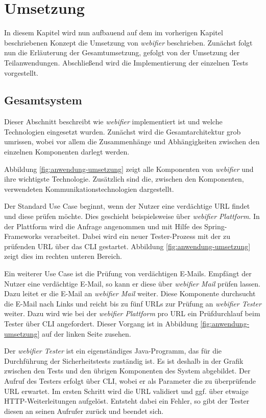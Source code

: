 \chapter{Umsetzung}

In diesem Kapitel wird nun aufbauend auf dem im vorherigen Kapitel beschriebenen Konzept die
Umsetzung von \textit{webifier} beschrieben. Zunächst folgt nun die Erläuterung der Gesamtumsetzung,
gefolgt von der Umsetzung der Teilanwendungen. Abschließend wird die Implementierung der einzelnen Tests vorgestellt.

\section{Gesamtsystem}

Dieser Abschnitt beschreibt wie \textit{webifier} implementiert ist und welche Technologien
eingesetzt wurden.
Zunächst wird die Gesamtarchitektur grob umrissen, wobei vor allem die Zusammenhänge
und Abhängigkeiten zwischen den einzelnen Komponenten darlegt werden.

Abbildung \ref{fig:anwendung-umsetzung} zeigt alle Komponenten von \textit{webifier} und ihre
wichtigste Technologie.
Zusätzlich sind die, zwischen den Komponenten, verwendeten
Kommunikationstechnologien dargestellt.

Der Standard Use Case beginnt, wenn der Nutzer eine verdächtige \acs{URL} findet und diese prüfen
möchte. Dies geschieht beispielsweise über \textit{webifier Plattform}.
In der Plattform wird die Anfrage angenommen und mit Hilfe des Spring-Frameworks verarbeitet.
Dabei wird ein neuer Tester-Prozess mit der zu prüfenden \acs{URL} über das \ac{CLI} gestartet.
Abbildung \ref{fig:anwendung-umsetzung} zeigt dies im rechten unteren Bereich.

Ein weiterer Use Case ist die Prüfung von verdächtigen E-Mails.
Empfängt der Nutzer eine verdächtige E-Mail, so kann er diese über \textit{webifier Mail} prüfen
lassen.
Dazu leitet er die E-Mail an \textit{webifier Mail} weiter.
Diese Komponente durchsucht die E-Mail nach Links und reicht bis zu fünf \acsp{URL} zur Prüfung an
\textit{webifier Tester} weiter.
Dazu wird wie bei der \textit{webifier Plattform} pro \acs{URL} ein Prüfdurchlauf beim Tester über
\ac{CLI} angefordert.
Dieser Vorgang ist in Abbildung \ref{fig:anwendung-umsetzung} auf der linken Seite zusehen.

Der \textit{webifier Tester} ist ein eigenständiges Java-Programm, das für die Durchführung der
Sicherheitstests zuständig ist.
Es ist deshalb in der Grafik zwischen den Tests und den übrigen Komponenten des System abgebildet.
Der Aufruf des Testers erfolgt über \ac{CLI}, wobei er als Parameter die zu überprüfende \acs{URL} erwartet.
Im ersten Schritt wird die \acs{URL} validiert und ggf. über etwaige \acs{HTTP}-Weiterleitungen
aufgelöst.
Entsteht dabei ein Fehler, so gibt der Tester diesen an seinen Aufrufer zurück und beendet sich.

